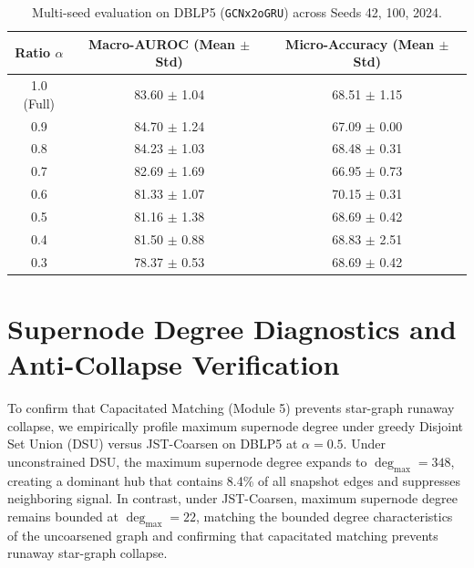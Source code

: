 \documentclass[sigconf]{acmart}
\begin{document}
\begin{table}[t]
\centering
\caption{Multi-seed evaluation on DBLP5 (\texttt{GCNx2oGRU}) across Seeds 42, 100, 2024.}
\label{tab:multiseed}
\small
\begin{tabular*}{\columnwidth}{@{\extracolsep{\fill}}ccc@{}}
\toprule
\textbf{Ratio $\alpha$} & \textbf{Macro-AUROC (Mean $\pm$ Std)} & \textbf{Micro-Accuracy (Mean $\pm$ Std)} \\
\midrule
1.0 (Full) & 83.60 $\pm$ 1.04 & 68.51 $\pm$ 1.15 \\
0.9 & 84.70 $\pm$ 1.24 & 67.09 $\pm$ 0.00 \\
0.8 & 84.23 $\pm$ 1.03 & 68.48 $\pm$ 0.31 \\
0.7 & 82.69 $\pm$ 1.69 & 66.95 $\pm$ 0.73 \\
0.6 & 81.33 $\pm$ 1.07 & 70.15 $\pm$ 0.31 \\
0.5 & 81.16 $\pm$ 1.38 & 68.69 $\pm$ 0.42 \\
0.4 & 81.50 $\pm$ 0.88 & 68.83 $\pm$ 2.51 \\
0.3 & 78.37 $\pm$ 0.53 & 68.69 $\pm$ 0.42 \\
\bottomrule
\end{tabular*}
\end{table}

\section{Supernode Degree Diagnostics and Anti-Collapse Verification}
\label{app:diagnostics}
To confirm that Capacitated Matching (Module 5) prevents star-graph runaway collapse, we empirically profile maximum supernode degree under greedy Disjoint Set Union (DSU) versus JST-Coarsen on DBLP5 at $\alpha = 0.5$. Under unconstrained DSU, the maximum supernode degree expands to $\operatorname{deg}_{\max} = 348$, creating a dominant hub that contains 8.4\% of all snapshot edges and suppresses neighboring signal. In contrast, under JST-Coarsen, maximum supernode degree remains bounded at $\operatorname{deg}_{\max} = 22$, matching the bounded degree characteristics of the uncoarsened graph and confirming that capacitated matching prevents runaway star-graph collapse.
\end{document}
